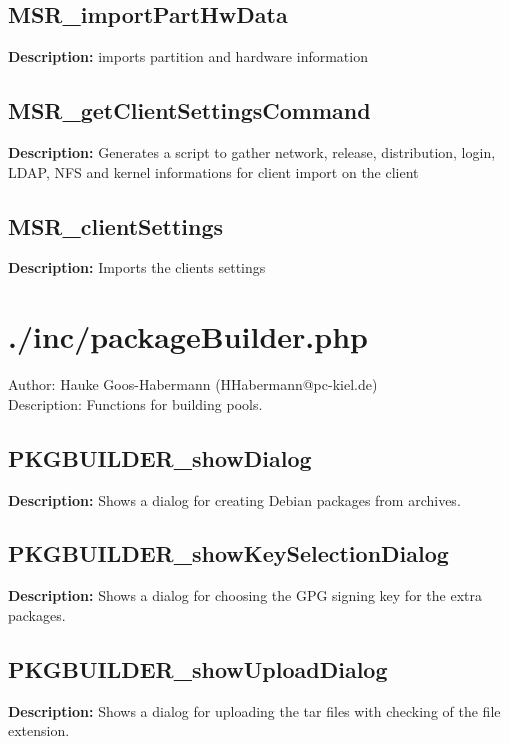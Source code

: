 \subsection{MSR\_importPartHwData}
\textbf{Description:} imports partition and hardware information\\

\subsection{MSR\_getClientSettingsCommand}
\textbf{Description:} Generates a script to gather network, release, distribution, login, LDAP, NFS and kernel informations for client import on the client\\

\subsection{MSR\_clientSettings}
\textbf{Description:} Imports the clients settings\\

\newpage\section{./inc/packageBuilder.php}
 Author: Hauke Goos-Habermann (HHabermann@pc-kiel.de)\\
 Description: Functions for building pools.\\

\subsection{PKGBUILDER\_showDialog}
\textbf{Description:} Shows a dialog for creating Debian packages from archives.\\

\subsection{PKGBUILDER\_showKeySelectionDialog}
\textbf{Description:} Shows a dialog for choosing the GPG signing key for the extra packages.\\

\subsection{PKGBUILDER\_showUploadDialog}
\textbf{Description:} Shows a dialog for uploading the tar files with checking of the file extension.\\

